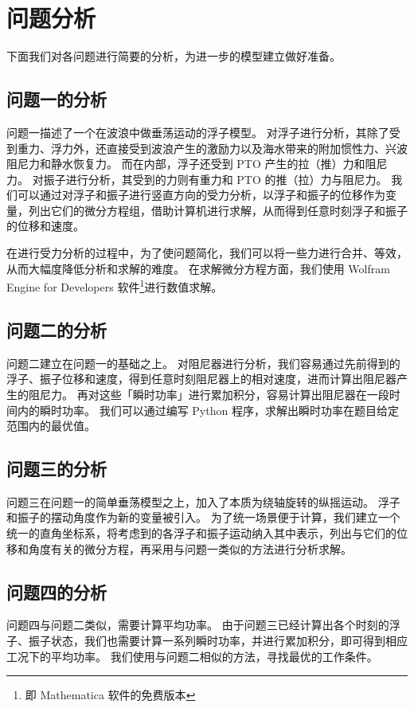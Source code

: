 \section{问题分析}

下面我们对各问题进行简要的分析，为进一步的模型建立做好准备。

\subsection{问题一的分析}

问题一描述了一个在波浪中做垂荡运动的浮子模型。
对浮子进行分析，其除了受到重力、浮力外，还直接受到波浪产生的激励力以及海水带来的附加惯性力、兴波阻尼力和静水恢复力。
而在内部，浮子还受到 PTO 产生的拉（推）力和阻尼力。
对振子进行分析，其受到的力则有重力和 PTO 的推（拉）力与阻尼力。
我们可以通过对浮子和振子进行竖直方向的受力分析，以浮子和振子的位移作为变量，列出它们的微分方程组，借助计算机进行求解，从而得到任意时刻浮子和振子的位移和速度。

在进行受力分析的过程中，为了使问题简化，我们可以将一些力进行合并、等效，从而大幅度降低分析和求解的难度。
在求解微分方程方面，我们使用 Wolfram Engine for Developers 软件\footnote{即 Mathematica 软件的免费版本}进行数值求解。

\subsection{问题二的分析}

问题二建立在问题一的基础之上。
对阻尼器进行分析，我们容易通过先前得到的浮子、振子位移和速度，得到任意时刻阻尼器上的相对速度，进而计算出阻尼器产生的阻尼力。
再对这些「瞬时功率」进行累加积分，容易计算出阻尼器在一段时间内的瞬时功率。
我们可以通过编写 Python 程序，求解出瞬时功率在题目给定范围内的最优值。

\subsection{问题三的分析}

问题三在问题一的简单垂荡模型之上，加入了本质为绕轴旋转的纵摇运动。
浮子和振子的摆动角度作为新的变量被引入。
为了统一场景便于计算，我们建立一个统一的直角坐标系，将考虑到的各浮子和振子运动纳入其中表示，列出与它们的位移和角度有关的微分方程，再采用与问题一类似的方法进行分析求解。

\subsection{问题四的分析}

问题四与问题二类似，需要计算平均功率。
由于问题三已经计算出各个时刻的浮子、振子状态，我们也需要计算一系列瞬时功率，并进行累加积分，即可得到相应工况下的平均功率。
我们使用与问题二相似的方法，寻找最优的工作条件。